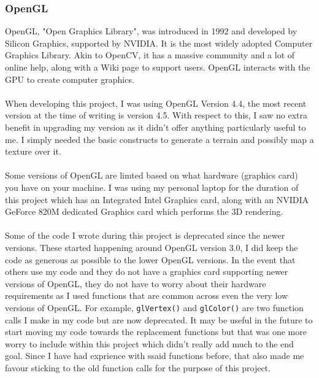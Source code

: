 \documentclass[11pt]{article}
\begin{document}
\subsubsection{OpenGL}
OpenGL, "Open Graphics Library", was introduced in 1992 and
developed by Silicon Graphics, supported by NVIDIA. 
It is the most widely adopted Computer Graphics Library. Akin to OpenCV, it
has a massive community and a lot of online help, along with a Wiki page to
support users. OpenGL interacts with the GPU to create computer graphics.\\
\\
When developing this project, I was using OpenGL Version 4.4, the most
recent version at the time of writing is version 4.5. With respect to this,
I saw no extra benefit in upgrading my version as it didn't offer anything
particularly useful to me. I simply needed the basic constructs
to generate a terrain and possibly map a texture over it.\\
\\
Some versions of OpenGL are limted based on what hardware (graphics card)
you have on your machine. I was using my personal laptop for the 
duration of this project which has an Integrated Intel Graphics card, along
with an NVIDIA GeForce 820M dedicated Graphics card which performs the 3D
rendering.\\
\\
Some of the code I wrote during this project is deprecated since the newer
versions. These started happening around OpenGL version 3.0, I did keep the
code as generous as possible to the lower OpenGL versions. In the event that
others use my code and they do not have a graphics card supporting
newer versions of OpenGL, they do not have to worry about their hardware 
requirements as I used functions that are common across even the very low
versions of OpenGL. For example, 
\texttt{glVertex()} and \texttt{glColor()} are two function calls I make in my
code but are now deprecated. It may be useful in the future to start moving
my code towards the replacement functions but that was one more worry
to include within this project which didn't really add much to the 
end goal. Since I have had exprience with ssaid functions before, 
that also made me favour sticking to the old function 
calls for the purpose of this project.
\end{document}
